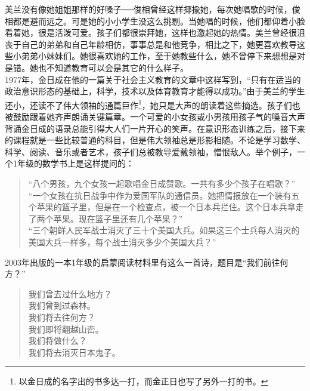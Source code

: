 美兰没有像她姐姐那样的好嗓子──俊相曾经这样揶揄她，每次她唱歌的时候，俊相都是避而远之。可是她的小小学生没这么挑剔。当她唱的时候，他们都仰着小脸看着她，很是活泼可爱。孩子们都很崇拜她，这样也激起她的热情。美兰曾经很沮丧于自己的弟弟和自己年龄相仿，事事总是和他竞争，相比之下，她更喜欢教导这些小弟弟小妹妹们。她很喜欢她的工作，至于她教些什么，她不曾停下来想想是对是错。她也不知道教育可以会是其它的什么样子。\\

1977年，金日成在他的一篇关于社会主义教育的文章中这样写到，“只有在适当的政治意识形态的基础上，科学，技术以及体育教育才能得以成功。”由于美兰的学生还小，还读不了伟大领袖的通篇巨作\footnote{以金日成的名字出的书多达一打，而金正日也写了另外一打的书。}，她只是大声的朗读着这些摘选。孩子们也被鼓励跟着她齐声朗诵关键篇章。一个可爱的小女孩或小男孩用孩子气的嗓音大声背诵金日成的语录总能引得大人们一片开心的笑声。在意识形态训练之后，接下来的课程就是一些比较普通的科目，但是伟大领袖总是形影相随。不论是学习数学、科学、阅读、音乐或者艺术，孩子们总被教导爱戴领袖，憎恨敌人。举个例子，一个1年级的数学书上是这样提问的：\\

\begin{quote}
	“八个男孩，九个女孩一起歌唱金日成赞歌。一共有多少个孩子在唱歌？”\\

	“一个女孩在抗日战争中作为爱国军队的通信员。她把情报放在一个装有五个苹果的篮子里，但是在一个检查点，被一个日本兵拦住。这个日本兵拿走了两个苹果。现在篮子里还有几个苹果？”\\

	“三个朝鲜人民军战士消灭了三十个美国大兵。如果这三个士兵每人消灭的美国大兵一样多，每个战士消灭多少个美国大兵？”\\
\end{quote}

2003年出版的一本1年级的启蒙阅读材料里有这么一首诗，题目是“我们前往何方？”\\

\begin{quote}
	我们曾去过什么地方？\\

	我们曾到过森林。\\

	我们将去往何方？\\

	我们即将翻越山峦。\\

	我们将做什么？\\

	我们将去消灭日本鬼子。\\
\end{quote}

